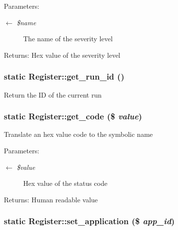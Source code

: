 \begin{Desc}
\item[Parameters:]
\begin{description}
\item[\mbox{$\leftarrow$} {\em \$name}]The name of the severity level \end{description}
\end{Desc}
\begin{Desc}
\item[Returns:]Hex value of the severity level \end{Desc}
\hypertarget{classRegister_041706fafb409a31f125d2075501e82e}{
\subsubsection{\setlength{\rightskip}{0pt plus 5cm}static Register::get\_\-run\_\-id ()}}
\label{classRegister_041706fafb409a31f125d2075501e82e}


Return the ID of the current run \hypertarget{classRegister_363389530273f40c3b20666bbff75e05}{
\subsubsection{\setlength{\rightskip}{0pt plus 5cm}static Register::get\_\-code (\$ {\em value})}}
\label{classRegister_363389530273f40c3b20666bbff75e05}


Translate an hex value code to the symbolic name

\begin{Desc}
\item[Parameters:]
\begin{description}
\item[\mbox{$\leftarrow$} {\em \$value}]Hex value of the status code \end{description}
\end{Desc}
\begin{Desc}
\item[Returns:]Human readable value \end{Desc}
\hypertarget{classRegister_d4d61787414f7d64d1e3420f0fdf3f91}{
\subsubsection{\setlength{\rightskip}{0pt plus 5cm}static Register::set\_\-application (\$ {\em app\_\-id})}}
\label{classRegister_d4d61787414f7d64d1e3420f0fdf3f91}


